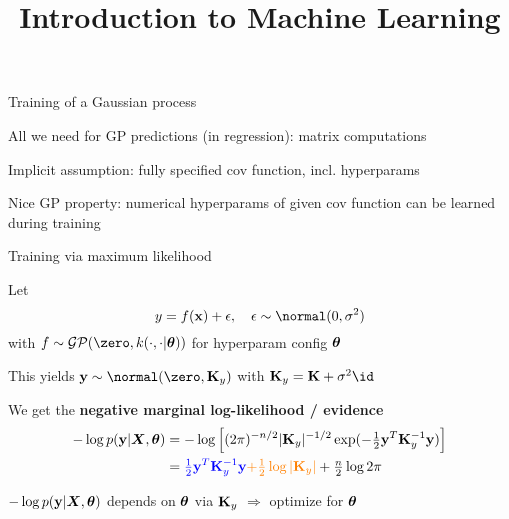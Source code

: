 \documentclass[11pt,compress,t,notes=noshow, xcolor=table]{beamer}
\title{Introduction to Machine Learning}
\begin{document}
\newcommand{\nmk}{\normal(\zero, \Kmat)} %
\newcommand{\nzk}{\normal(\zero, \Kmat)}
\newcommand{\xxtnorm}{\| \xv - \xtil \|}
\newcommand{\kcc}{k(\cdot, \cdot)} 
\newcommand{\kxxt}{k(\xv, \xtil)} %
\newcommand{\Xsubset}{\bm{X}}
\newcommand{\fX}{f(\Xsubset)}
\newcommand{\kXX}{k(\Xsubset, \Xsubset)}
\newcommand{\mX}{m(\Xsubset)}
\newcommand{\gpmk}{\mathcal{GP}(m(\cdot), k(\cdot, \cdot))}
\newcommand{\gpzk}{\mathcal{GP}(\zero, k(\cdot, \cdot))}
\newcommand{\Kmatinv}{\Kmat^{-1}}
\newcommand{\xstar}{\xv_\ast}
\newcommand{\ystar}{\yv_\ast}
\newcommand{\fstar}{\fv_\ast}
\newcommand{\Xstar}{\Xmat_\ast}
\newcommand{\Ky}{\Kmat_y}


\begin{framei}[sep=L]{Training of a Gaussian process}
\item All we need for GP predictions (in regression): matrix computations
\item Implicit assumption: fully specified cov function, incl. hyperparams
\item Nice GP property: numerical hyperparams of given cov function can be learned during training
\end{framei}

\begin{framei}[sep=L]{Training via maximum likelihood}
\item Let $$y = \fx + \epsilon, \quad \epsilon \sim \normal(0, \sigma^2)$$
with $f \sim \mathcal{GP}(\zero, k(\cdot, \cdot | \thetav))$ for hyperparam config $\bm{\theta}$
\item This yields $\yv \sim \normal(\zero, \Ky )$ with  $\Ky = \Kmat + \sigma^2 \id$
\item We get the \textbf{negative marginal log-likelihood / evidence}
\begin{eqnarray*}
-\log p(\yv | \bm{X}, \thetav) &= -\log \left[(2 \pi )^{-n / 2} |\Ky|^{-1 / 2} \exp(- \tfrac{1}{2} \yv^T \Ky^{-1} \yv) \right] \\
&= \textcolor{blue}{\tfrac{1}{2} \yv^T \Ky^{-1} \yv} \textcolor{orange}{+ \tfrac{1}{2} \log | \Ky |}  + \tfrac{n}{2} \log 2 \pi
\end{eqnarray*}
\item $-\log p(\mathbf{y} | \bm{X}, \bm{\theta})$ depends on $\bm{\theta}$ via $\Ky$ $\Rightarrow$ optimize for $\bm{\theta}$
\end{framei}
\end{document}
